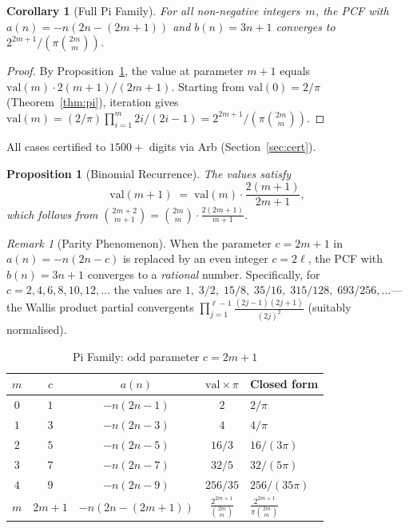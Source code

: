 \documentclass[11pt,a4paper]{article}
\theoremstyle{plain}
\newtheorem{proposition}[theorem]{Proposition}
\newtheorem{corollary}[theorem]{Corollary}
\theoremstyle{remark}
\newtheorem{remark}[theorem]{Remark}
\begin{document}
\begin{corollary}[Full Pi Family]\label{cor:pi-full}
For all non-negative integers~$m$, the PCF with
$a(n) = -n(2n - (2m{+}1))$ and $b(n) = 3n + 1$ converges to
$2^{2m+1}/(\pi\binom{2m}{m})$.
\end{corollary}

\begin{proof}
By Proposition~\ref{prop:recurrence}, the value at parameter $m{+}1$ equals
$\mathrm{val}(m) \cdot 2(m{+}1)/(2m{+}1)$.
Starting from $\mathrm{val}(0) = 2/\pi$ (Theorem~\ref{thm:pi}),
iteration gives
$\mathrm{val}(m) = (2/\pi)\prod_{i=1}^{m}2i/(2i{-}1)
= 2^{2m+1}/(\pi\binom{2m}{m})$.
\end{proof}

\noindent All cases certified to $1500{+}$ digits via Arb
(Section~\ref{sec:cert}).

\begin{proposition}[Binomial Recurrence]\label{prop:recurrence}
The values satisfy
\[
  \mathrm{val}(m{+}1) \;=\; \mathrm{val}(m) \cdot \frac{2(m{+}1)}{2m{+}1},
\]
which follows from $\binom{2m+2}{m+1} = \binom{2m}{m}\cdot\frac{2(2m+1)}{m+1}$.
\end{proposition}

\begin{remark}[Parity Phenomenon]\label{rem:parity}
When the parameter $c = 2m+1$ in $a(n) = -n(2n-c)$ is replaced by
an even integer $c = 2\ell$, the PCF with $b(n) = 3n+1$ converges to
a \emph{rational} number.
Specifically, for $c = 2, 4, 6, 8, 10, 12, \ldots$ the values are
$1,\; 3/2,\; 15/8,\; 35/16,\; 315/128,\; 693/256, \ldots$\;---the
Wallis product partial convergents $\prod_{j=1}^{\ell-1}\frac{(2j-1)(2j+1)}{(2j)^2}$
(suitably normalised).
\end{remark}

\begin{table}[h]
\centering
\caption{Pi Family: odd parameter $c = 2m+1$}
\label{tab:pi}
\begin{tabular}{@{}ccccl@{}}
\toprule
$m$ & $c$ & $a(n)$ & $\text{val}\times\pi$ & Closed form \\
\midrule
$0$ & $1$ & $-n(2n{-}1)$  & $2$      & $2/\pi$ \\
$1$ & $3$ & $-n(2n{-}3)$  & $4$      & $4/\pi$ \\
$2$ & $5$ & $-n(2n{-}5)$  & $16/3$   & $16/(3\pi)$ \\
$3$ & $7$ & $-n(2n{-}7)$  & $32/5$   & $32/(5\pi)$ \\
$4$ & $9$ & $-n(2n{-}9)$  & $256/35$ & $256/(35\pi)$ \\
$m$ & $2m{+}1$ & $-n(2n{-}(2m{+}1))$ & $\frac{2^{2m+1}}{\binom{2m}{m}}$ &
  $\frac{2^{2m+1}}{\pi\binom{2m}{m}}$ \\
\bottomrule
\end{tabular}
\end{table}
\end{document}
